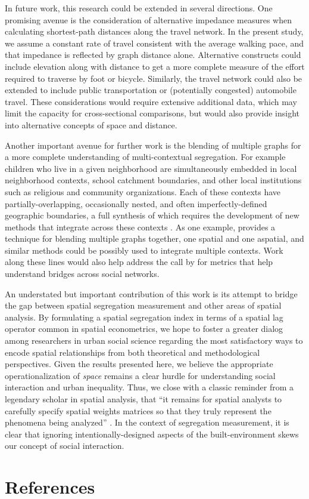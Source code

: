 \documentclass[
  10pt,
]{article}
\begin{document}
In future work, this research could be extended in several directions.
One promising avenue is the consideration of alternative impedance
measures when calculating shortest-path distances along the travel
network. In the present study, we assume a constant rate of travel
consistent with the average walking pace, and that impedance is
reflected by graph distance alone. Alternative constructs could include
elevation along with distance to get a more complete measure of the
effort required to traverse by foot or bicycle. Similarly, the travel
network could also be extended to include public transportation or
(potentially congested) automobile travel. These considerations would
require extensive additional data, which may limit the capacity for
cross-sectional comparisons, but would also provide insight into
alternative concepts of space and distance.

Another important avenue for further work is the blending of multiple
graphs for a more complete understanding of multi-contextual
segregation. For example children who live in a given neighborhood are
simultaneously embedded in local neighborhood contexts, school catchment
boundaries, and other local institutions such as religious and community
organizations. Each of these contexts have partially-overlapping,
occasionally nested, and often imperfectly-defined geographic
boundaries, a full synthesis of which requires the development of new
methods that integrate across these contexts
\citep{galster2001NatureNeighbourhood, galster2019making}. As one
example, \citet{wolf2021SpatiallyEncouraged} provides a technique for
blending multiple graphs together, one spatial and one aspatial, and
similar methods could be possibly used to integrate multiple contexts.
Work along these lines would also help address the call by
\citet[p.~156]{reardon2004MeasuresSpatial} for metrics that help
understand bridges across social networks.

An understated but important contribution of this work is its attempt to
bridge the gap between spatial segregation measurement and other areas
of spatial analysis. By formulating a spatial segregation index in terms
of a spatial lag operator common in spatial econometrics, we hope to
foster a greater dialog among researchers in urban social science
regarding the most satisfactory ways to encode spatial relationships
from both theoretical and methodological perspectives. Given the results
presented here, we believe the appropriate operationalization of
\emph{space} remains a clear hurdle for understanding social interaction
and urban inequality. Thus, we close with a classic reminder from a
legendary scholar in spatial analysis, that ``it remains for spatial
analysts to carefully specify spatial weights matrices so that they
truly represent the phenomena being analyzed''
\citep[p.409]{getis2009SpatialWeights}. In the context of segregation
measurement, it is clear that ignoring intentionally-designed aspects of
the built-environment skews our concept of social interaction.

\hypertarget{references}{%
\section{References}\label{references}}


  
\end{document}
